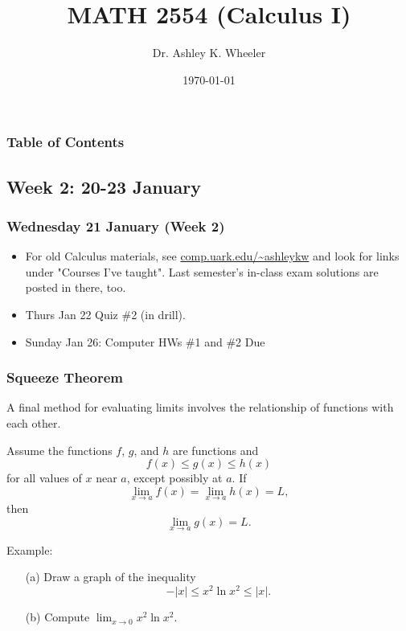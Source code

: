 \documentclass[14pt]{beamer}
\title[Cal I S2015]{MATH 2554 (Calculus I)}
\subtitle{}
\author[Wheeler]{Dr. Ashley K. Wheeler}
\institute{University of Arkansas}
\date{\today}
\begin{document}
\maketitle

\begin{frame}
\frametitle{Table of Contents}
\tableofcontents
\end{frame}

\begin{frame}
\section[Week 2]{Week 2: 20-23 January}
\frametitle{Wednesday 21 January (Week 2)}
\begin{itemize}
\item For old Calculus materials, see \url{comp.uark.edu/~ashleykw} and look for links under "Courses I've taught".  Last semester's in-class exam solutions are posted in there, too.
\item Thurs Jan 22 Quiz \#2 (in drill).  
\item Sunday Jan 26:  Computer HWs \#1  and \#2 Due
\end{itemize}
\end{frame}

\begin{frame}
\frametitle{Squeeze Theorem}
\small
A final method for evaluating limits involves the relationship of functions with each other.
\footnotesize
\begin{thm}  Assume the functions $f$, $g$, and $h$ are functions and 
\[f(x)\le g(x) \le h(x)\] 
for all values of $x$ near $a$, except possibly at $a$.  If 
\[\displaystyle\lim_{x \to a}f(x)=\displaystyle\lim_{x \to a} h(x)=L,\] 
then 
\[\displaystyle\lim_{x \to a} g(x)=L.\] \end{thm}
\end{frame}

\begin{frame}
Example: 

\vspace{0.5pc}
\begin{itemize}
\item[(a)]Draw a graph of the inequality 
\[-|x| \le x^2 \ln x^2 \le |x|.\]

\vspace{0.5pc}
\item[(b)] Compute $\displaystyle\lim_{x \to 0} x^2 \ln x^2.$
\end{itemize}
\end{frame}
\end{document}
